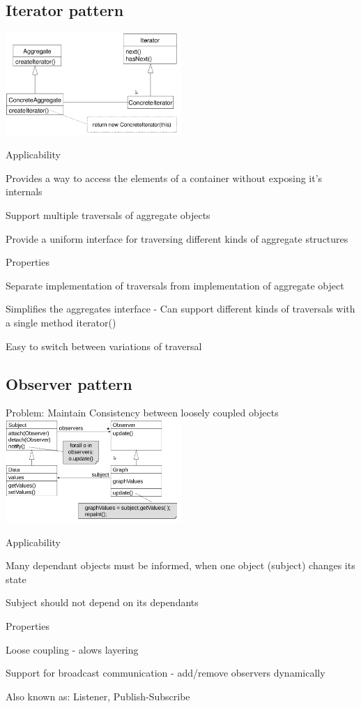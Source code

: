 \documentclass[10pt]{article}
\begin{document}
\subsection{Iterator pattern}
\includegraphics[width=0.5\textwidth]{iterator_pattern.png}
\enumstart
	\item Applicability
	\enumstart
		\item Provides a way to access the elements of a container without exposing it's internals
		\item Support multiple traversals of aggregate objects
		\item Provide a uniform interface for traversing different kinds of aggregate structures
	\enumend
	\item Properties
	\enumstart
		\item Separate implementation of traversals from implementation of aggregate object
		\item Simplifies the aggregates interface - Can support different kinds of traversals with a single method iterator()
		\item Easy to switch between variations of traversal
	\enumend
\enumend

\subsection{Observer pattern}
\enumstart
	\item Problem: Maintain Consistency between loosely coupled objects
	\\ \includegraphics[width=0.5\textwidth]{observer_pattern.png}
	\item Applicability
	\enumstart
		\item Many dependant objects must be informed, when one object (subject) changes its state
		\item Subject should not depend on its dependants
	\enumend
	\item Properties
	\enumstart
		\item Loose coupling - alows layering
		\item Support for broadcast communication - add/remove observers dynamically
		\item Also known as: Listener, Publish-Subscribe
	\enumend
\enumend
\end{document}
